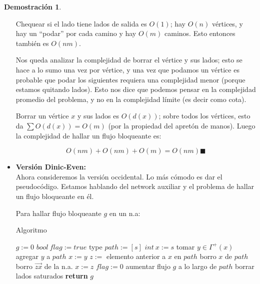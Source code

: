 \documentclass[11pt, a4paper]{article}
\theoremstyle{definition}
\newtheorem*{demostracion}{Demostración}
\begin{document}
\begin{demostracion}
\begin{itemize}
        Chequear si el lado tiene lados de salida es $O(1)$; hay $O(n)$ vértices, y hay un ``podar'' por cada camino y hay $O(m)$ caminos. Esto entonces también es $O(nm)$.
        
        Nos queda analizar la complejidad de borrar el vértice y sus lados; esto se hace a lo sumo una vez por vértice, y una vez que podamos un vértice es probable que podar los siguientes requiera una complejidad menor (porque estamos quitando lados). Esto nos dice que podemos pensar en la complejidad promedio del problema, y no en la complejidad límite (es decir como cota).
        
        Borrar un vértice $x$ y sus lados es $O(d(x))$; sobre todos los vértices, esto da $\sum O(d(x)) = O(m)$ (por la propiedad del apretón de manos). Luego la complejidad de hallar un flujo bloqueante es:
        
        \[
        O(nm) + O(nm) + O(m) = O(nm) \blacksquare
        \]
        \item \textbf{Versión Dinic-Even: } \\
        Ahora consideremos la versión occidental. Lo más cómodo es dar el pseudocódigo. Estamos hablando del network auxiliar y el problema de hallar un flujo bloqueante en él.

        Para hallar flujo bloqueante $g$ en un n.a:
        \begin{algorithm}[!ht]
            \caption{Algoritmo}
            \begin{algorithmic}[1]
            \State $g := 0$
            \State $bool\ flag := true$
               \State type $path := [s]$
               \State $int\ x := s$
                       \State tomar $y \in \Gamma^+(x)$
                       \State agregar $y$ a $path$
                       \State $x := y$ 
                   \Else
                           \State $z :=$ elemento anterior a $x$ en $path$ 
                           \State borro $x$ de $path$
                           \State borro $\overrightarrow{zx}$ de la n.a.
                           \State $x := z$
                       \Else
                           \State $flag := 0$
                       \EndIf
                   \EndIf
               \EndWhile
                   \State aumentar flujo $g$ a lo largo de $path$ 
                   \State borrar lados saturados
               \EndIf
            \EndWhile
            \State \textbf{return} $g$
            \end{algorithmic}
            \end{algorithm}
            \FloatBarrier


\end{itemize}
\end{demostracion}
\end{document}
